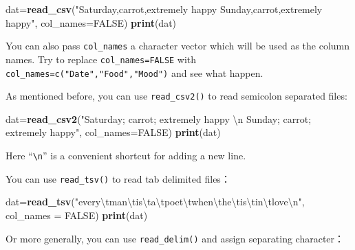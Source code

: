 \documentclass[12pt,]{krantz}
\makeatletter
\newenvironment{Shaded}{\begin{snugshade}}{\end{snugshade}}
\newcommand{\KeywordTok}[1]{\textcolor[rgb]{0.27,0.27,0.27}{\textbf{#1}}}
\newcommand{\DataTypeTok}[1]{\textcolor[rgb]{0.27,0.27,0.27}{#1}}
\newcommand{\CharTok}[1]{\textcolor[rgb]{0.5,0.5,0.5}{#1}}
\newcommand{\StringTok}[1]{\textcolor[rgb]{0.5,0.5,0.5}{#1}}
\newcommand{\OtherTok}[1]{\textcolor[rgb]{0.37,0.37,0.37}{#1}}
\newcommand{\NormalTok}[1]{#1}
\newenvironment{kframe}{%
\medskip{}
\setlength{\fboxsep}{.8em}
 \def\at@end@of@kframe{}%
 \ifinner\ifhmode%
  \def\at@end@of@kframe{\end{minipage}}%
  \begin{minipage}{\columnwidth}%
 \fi\fi%
 \def\FrameCommand##1{\hskip\@totalleftmargin \hskip-\fboxsep
 \colorbox{shadecolor}{##1}\hskip-\fboxsep
     \hskip-\linewidth \hskip-\@totalleftmargin \hskip\columnwidth}%
 \MakeFramed {\advance\hsize-\width
   \@totalleftmargin\z@ \linewidth\hsize
   \@setminipage}}%
 {\par\unskip\endMakeFramed%
 \at@end@of@kframe}
\renewenvironment{Shaded}{\begin{kframe}}{\end{kframe}}
\theoremstyle{definition}
\theoremstyle{definition}
\theoremstyle{definition}
\theoremstyle{remark}
\makeatother
\begin{document}
\begin{Shaded}
\begin{Highlighting}[]
\NormalTok{dat=}\KeywordTok{read_csv}\NormalTok{(}\StringTok{"Saturday,carrot,extremely happy}
\StringTok{          Sunday,carrot,extremely happy"}\NormalTok{, }\DataTypeTok{col_names=}\OtherTok{FALSE}\NormalTok{)}
\KeywordTok{print}\NormalTok{(dat)}
\end{Highlighting}
\end{Shaded}

You can also pass \texttt{col\_names} a character vector which will be
used as the column names. Try to replace \texttt{col\_names=FALSE} with
\texttt{col\_names=c("Date","Food","Mood")} and see what happen.

As mentioned before, you can use \texttt{read\_csv2()} to read semicolon
separated files:

\begin{Shaded}
\begin{Highlighting}[]
\NormalTok{dat=}\KeywordTok{read_csv2}\NormalTok{(}\StringTok{"Saturday; carrot; extremely happy }\CharTok{\textbackslash{}n}\StringTok{ Sunday; carrot; extremely happy"}\NormalTok{, }\DataTypeTok{col_names=}\OtherTok{FALSE}\NormalTok{)}
\KeywordTok{print}\NormalTok{(dat)}
\end{Highlighting}
\end{Shaded}

Here ``\texttt{\textbackslash{}n}'' is a convenient shortcut for adding
a new line.

You can use \texttt{read\_tsv()} to read tab delimited files：

\begin{Shaded}
\begin{Highlighting}[]
\NormalTok{dat=}\KeywordTok{read_tsv}\NormalTok{(}\StringTok{"every}\CharTok{\textbackslash{}t}\StringTok{man}\CharTok{\textbackslash{}t}\StringTok{is}\CharTok{\textbackslash{}t}\StringTok{a}\CharTok{\textbackslash{}t}\StringTok{poet}\CharTok{\textbackslash{}t}\StringTok{when}\CharTok{\textbackslash{}t}\StringTok{he}\CharTok{\textbackslash{}t}\StringTok{is}\CharTok{\textbackslash{}t}\StringTok{in}\CharTok{\textbackslash{}t}\StringTok{love}\CharTok{\textbackslash{}n}\StringTok{"}\NormalTok{, }\DataTypeTok{col_names =} \OtherTok{FALSE}\NormalTok{)}
\KeywordTok{print}\NormalTok{(dat)}
\end{Highlighting}
\end{Shaded}

Or more generally, you can use \texttt{read\_delim()} and assign
separating character：
\end{document}
